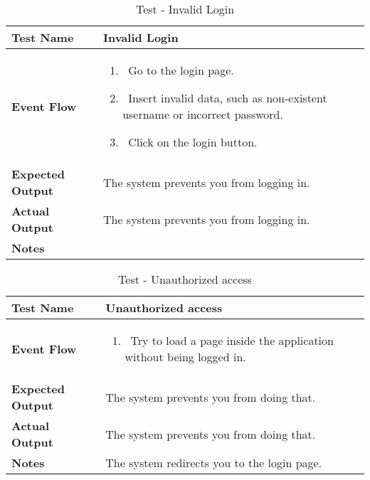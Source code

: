 \begin{table}[h]	
\centering
\def\arraystretch{1.5}
\begin{tabular}{|m{7cm}|m{7cm}|}
	\hline
	\textbf{Test Name}            &  Invalid Login  \\ \hline
	\textbf{Event Flow}             &  
		\begin{enumerate}
				\item~Go to the login page.
				\item~Insert invalid data, such as non-existent username or incorrect password.
				\item~Click on the login button.
		\end{enumerate}
		 \\ \hline
	\textbf{Expected Output}  &  The system prevents you from logging in.  \\ \hline
	\textbf{Actual Output}       &  The system prevents you from logging in.   \\ \hline
	\textbf{Notes} & \\ \hline
\end{tabular}
\caption{Test - Invalid Login}
\end{table}


\begin{table}[h]	
	\centering
	\def\arraystretch{1.5}
	\begin{tabular}{|m{7cm}|m{7cm}|}
		\hline
		\textbf{Test Name}            &  Unauthorized access  \\ \hline
		\textbf{Event Flow}             &  
		\begin{enumerate}
			\item~Try to load a page inside the application without being logged in.
		\end{enumerate}
		\\ \hline
		\textbf{Expected Output}  &  The system prevents you from doing that.   \\ \hline
		\textbf{Actual Output}       &  The system prevents you from doing that.   \\ \hline
		\textbf{Notes} & The system redirects you to the login page. \\ \hline
	\end{tabular}
	\caption{Test - Unauthorized access}
\end{table}


